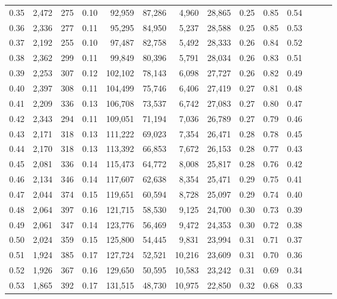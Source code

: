 \begin{tabular}{rrrrrrrrrrrrrr}
0.35 &  2,472 &  275 &  0.10 &   92,959 &   87,286 &   4,960 &  28,865 &  0.25 &  0.85 &      0.54 \\
0.36 &  2,336 &  277 &  0.11 &   95,295 &   84,950 &   5,237 &  28,588 &  0.25 &  0.85 &      0.53 \\
0.37 &  2,192 &  255 &  0.10 &   97,487 &   82,758 &   5,492 &  28,333 &  0.26 &  0.84 &      0.52 \\
0.38 &  2,362 &  299 &  0.11 &   99,849 &   80,396 &   5,791 &  28,034 &  0.26 &  0.83 &      0.51 \\
0.39 &  2,253 &  307 &  0.12 &  102,102 &   78,143 &   6,098 &  27,727 &  0.26 &  0.82 &      0.49 \\
0.40 &  2,397 &  308 &  0.11 &  104,499 &   75,746 &   6,406 &  27,419 &  0.27 &  0.81 &      0.48 \\
0.41 &  2,209 &  336 &  0.13 &  106,708 &   73,537 &   6,742 &  27,083 &  0.27 &  0.80 &      0.47 \\
0.42 &  2,343 &  294 &  0.11 &  109,051 &   71,194 &   7,036 &  26,789 &  0.27 &  0.79 &      0.46 \\
0.43 &  2,171 &  318 &  0.13 &  111,222 &   69,023 &   7,354 &  26,471 &  0.28 &  0.78 &      0.45 \\
0.44 &  2,170 &  318 &  0.13 &  113,392 &   66,853 &   7,672 &  26,153 &  0.28 &  0.77 &      0.43 \\
0.45 &  2,081 &  336 &  0.14 &  115,473 &   64,772 &   8,008 &  25,817 &  0.28 &  0.76 &      0.42 \\
0.46 &  2,134 &  346 &  0.14 &  117,607 &   62,638 &   8,354 &  25,471 &  0.29 &  0.75 &      0.41 \\
0.47 &  2,044 &  374 &  0.15 &  119,651 &   60,594 &   8,728 &  25,097 &  0.29 &  0.74 &      0.40 \\
0.48 &  2,064 &  397 &  0.16 &  121,715 &   58,530 &   9,125 &  24,700 &  0.30 &  0.73 &      0.39 \\
0.49 &  2,061 &  347 &  0.14 &  123,776 &   56,469 &   9,472 &  24,353 &  0.30 &  0.72 &      0.38 \\
0.50 &  2,024 &  359 &  0.15 &  125,800 &   54,445 &   9,831 &  23,994 &  0.31 &  0.71 &      0.37 \\
0.51 &  1,924 &  385 &  0.17 &  127,724 &   52,521 &  10,216 &  23,609 &  0.31 &  0.70 &      0.36 \\
0.52 &  1,926 &  367 &  0.16 &  129,650 &   50,595 &  10,583 &  23,242 &  0.31 &  0.69 &      0.34 \\
0.53 &  1,865 &  392 &  0.17 &  131,515 &   48,730 &  10,975 &  22,850 &  0.32 &  0.68 &      0.33 \\

\end{tabular}
